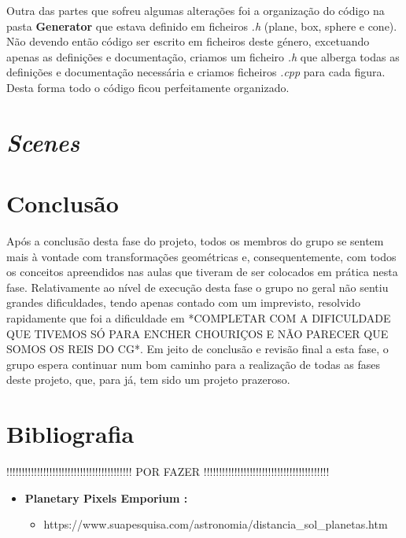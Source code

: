 \documentclass[a4paper]{article}
\begin{document}
Outra das partes que sofreu algumas alterações foi a organização do código na pasta \textbf{Generator} que estava definido em ficheiros \emph{.h} (plane, box, sphere e cone). Não devendo então código ser escrito em ficheiros deste género, excetuando apenas as definições e documentação, criamos um ficheiro \emph{.h} que alberga todas as definições e documentação necessária e criamos ficheiros \emph{.cpp} para cada figura. Desta forma todo o código ficou perfeitamente organizado.


\newpage

\section{\textit{Scenes}}


\newpage

\section{Conclusão}
\label{sec:conclusao}

Após a conclusão desta fase do projeto, todos os membros do grupo se sentem mais à vontade com transformações geométricas e, consequentemente, com todos os conceitos apreendidos nas aulas que tiveram de ser colocados em prática nesta fase. Relativamente ao nível de execução desta fase o grupo no geral não sentiu grandes dificuldades, tendo apenas contado com um imprevisto, resolvido rapidamente que foi a dificuldade em *COMPLETAR COM A DIFICULDADE QUE TIVEMOS SÓ PARA ENCHER CHOURIÇOS E NÃO PARECER QUE SOMOS OS REIS DO CG*.
Em jeito de conclusão e revisão final a esta fase, o grupo espera continuar num bom caminho para a realização de todas as fases deste projeto, que, para já, tem sido um projeto prazeroso.

\section{Bibliografia}
\label{sec:bibliografia}

!!!!!!!!!!!!!!!!!!!!!!!!!!!!!!!!!!!!!!!!! POR FAZER !!!!!!!!!!!!!!!!!!!!!!!!!!!!!!!!!!!!!!!!!

\begin{itemize}

  \item \textbf{Planetary Pixels Emporium :}
  \begin{itemize}
    \item https://www.suapesquisa.com/astronomia/distancia\_sol\_planetas.htm
  \end{itemize}

\end{itemize}
\end{document}
